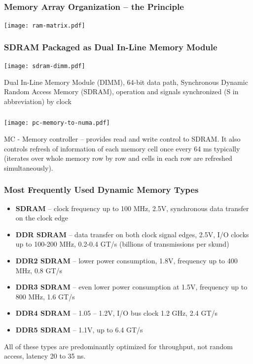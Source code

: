 \documentclass{beamer}
\begin{document}
\begin{frame}
\frametitle{Memory Array Organization -- the Principle}

\centering

\texttt{[image: ram-matrix.pdf]}

\end{frame}

\begin{frame}
\frametitle{SDRAM Packaged as Dual In-Line Memory Module}

\centering

\texttt{[image: sdram-dimm.pdf]}

Dual In-Line Memory Module (DIMM), 64-bit data path, Synchronous Dynamic Random Access Memory (SDRAM), operation and signals synchronized (S in abbreviation) by clock

\end{frame}

\begin{frame}
\frametitle{}

{
\centering

\texttt{[image: pc-memory-to-numa.pdf]}

}

\vskip 2mm

MC - Memory controller -- provides read and write control to SDRAM. It also controls refresh of information of each memory cell once every 64 ms typically (iterates over whole memory row by row and cells in each row are refreshed simultaneously).
\end{frame}


\begin{frame}
\frametitle{Most Frequently Used Dynamic Memory Types}

\begin{itemize}
\item \textbf{SDRAM} -- clock frequency up to 100 MHz, 2.5V, synchronous data transfer on the clock edge
\item \textbf{DDR SDRAM} -- data transfer on both clock signal edges, 2.5V, I/O clocks up to 100-200 MHz, 0.2-0.4 GT/s (billions of transmissions per skund)
\item \textbf{DDR2 SDRAM} -- lower power consumption, 1.8V, frequency up to 400 MHz, 0.8 GT/s
\item \textbf{DDR3 SDRAM} -- even lower power consumption at 1.5V, frequency up to 800 MHz, 1.6 GT/s
\item \textbf{DDR4 SDRAM} -- 1.05 -- 1.2V, I/O bus clock 1.2 GHz, 2.4 GT/s
\item \textbf{DDR5 SDRAM} -- 1.1V, up to 6.4 GT/s
\end{itemize}

All of these types are predominantly optimized for throughput, not random access, latency 20 to 35 ns.

\end{frame}
\end{document}
